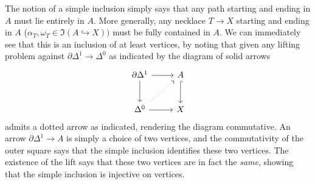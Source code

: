 \begin{remark}\label{1.3.1.4}
	The notion of a simple inclusion simply says that any path starting and ending in $A$ must lie entirely in $A$. More generally, any necklace $T\to X$ starting and ending in $A$ ($\alpha _T,\omega _T\in \Im (A\hookrightarrow X))$ must be fully contained in $A$. We can immediately see that this is an inclusion of at least vertices, by noting that given any lifting problem against $\partial \Delta ^1\to \Delta ^0$ as indicated by the diagram of solid arrows
	\[\begin{tikzcd}[row sep = 2.5em, column sep = 2.5em]
	\partial \Delta ^1\ar[r] \ar[d]  & A \ar[hook, d]  \\
	\Delta ^0\ar[r]\ar[dotted, ur]  & X
	\end{tikzcd}\]
	admits a dotted arrow as indicated, rendering the diagram commutative. An arrow $\partial \Delta ^1\to A$ is simply a choice of two vertices, and the commutativity of the outer square says that the simple inclusion identifies these two vertices. The existence of the lift says that these two vertices are in fact the \emph{same}, showing that the simple inclusion is injective on vertices.
\end{remark}

